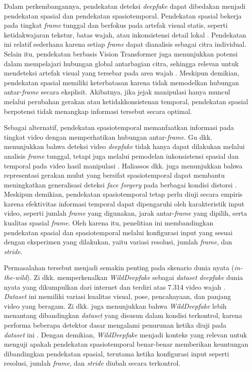 Dalam perkembangannya, pendekatan deteksi \textit{deepfake} dapat dibedakan menjadi pendekatan spasial dan pendekatan spasiotemporal. Pendekatan spasial bekerja pada tingkat \textit{frame} tunggal dan berfokus pada artefak visual statis, seperti ketidakwajaran tekstur, batas wajah, atau inkonsistensi detail lokal \cite{Tolosana2020,Cao2022}. Pendekatan ini relatif sederhana karena setiap \textit{frame} dapat dianalisis sebagai citra individual. Selain itu, pendekatan berbasis Vision Transformer juga menunjukkan potensi dalam mempelajari hubungan global antarbagian citra, sehingga relevan untuk mendeteksi artefak visual yang tersebar pada area wajah \cite{dosovitskiy2021imageworth16x16words,app12062953}. Meskipun demikian, pendekatan spasial memiliki keterbatasan karena tidak memodelkan hubungan antar-\textit{frame} secara eksplisit. Akibatnya, jika jejak manipulasi hanya muncul melalui perubahan gerakan atau ketidakkonsistenan temporal, pendekatan spasial berpotensi tidak menangkap informasi tersebut secara optimal. \par

Sebagai alternatif, pendekatan spasiotemporal memanfaatkan informasi pada tingkat video dengan memperhatikan hubungan antar-\textit{frame}. Gu dkk. menunjukkan bahwa deteksi video \textit{deepfake} tidak hanya dapat dilakukan melalui analisis \textit{frame} tunggal, tetapi juga melalui pemodelan inkonsistensi spasial dan temporal pada video hasil manipulasi \cite{Gu2021}. Haliassos dkk. juga menunjukkan bahwa representasi gerakan mulut yang bersifat spasiotemporal dapat membantu meningkatkan generalisasi deteksi \textit{face forgery} pada berbagai kondisi distorsi \cite{Haliassos2021}. Meskipun demikian, pendekatan spasiotemporal tetap perlu diuji secara empiris karena efektivitas informasi temporal dapat dipengaruhi oleh karakteristik input video, seperti jumlah \textit{frame} yang digunakan, jarak antar-\textit{frame} yang dipilih, serta kualitas spasial \textit{frame}. Oleh karena itu, penelitian ini membandingkan pendekatan spasial dan spasiotemporal melalui konfigurasi input yang sesuai dengan eksperimen yang dilakukan, yaitu variasi resolusi, jumlah \textit{frame}, dan \textit{stride}. \par

Permasalahan tersebut menjadi semakin penting pada skenario dunia nyata (\textit{in-the-wild}). Zi dkk. memperkenalkan \textit{WildDeepfake} sebagai \textit{dataset} \textit{deepfake} dunia nyata yang dikumpulkan dari internet dan terdiri atas 7.314 video wajah \cite{Zi2024}. \textit{Dataset} ini memiliki variasi kualitas visual, pose, pencahayaan, dan panjang video yang beragam. Zi dkk. juga menunjukkan bahwa \textit{WildDeepfake} lebih menantang dibandingkan \textit{dataset} yang disusun dalam kondisi terkontrol, karena performa beberapa detektor dasar mengalami penurunan ketika diuji pada \textit{dataset} ini \cite{Zi2024}. Dengan demikian, \textit{WildDeepfake} menjadi konteks yang relevan untuk menguji apakah pendekatan spasiotemporal benar-benar memberikan keuntungan dibandingkan pendekatan spasial, terutama ketika konfigurasi input seperti resolusi, jumlah \textit{frame}, dan \textit{stride} diubah secara terkontrol. \par

